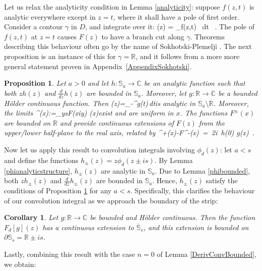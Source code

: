 \documentclass[12pt]{article}
\theoremstyle{plain}
\newtheorem{proposition}[theorem]{Proposition}
\newtheorem{corollary}[theorem]{Corollary}
\theoremstyle{definition}
\numberwithin{equation}{section}
\numberwithin{theorem}{section}
\def\be#1\ee{\begin{equation}#1\end{equation}}
\begin{document}
Let us relax the analyticity condition in Lemma \ref{analyticity}: suppose $f(z,t)$ is analytic everywhere except in $z=t$, where it shall have a pole of first order. Consider a contour $\gamma$ in $D$, and integrate over it: \be
F(z) = \int_\gamma f(z,t) \, dt \ .\ee 
The pole of $f(z,t)$ at $z=t$ causes $F(z)$ to have a branch cut along $\gamma$. Theorems describing this behaviour often go by the name of Sokhotski-Plemelji \cite{Gakhov}. 
The next proposition is an instance of this for $\gamma=\mathbb{R}$, and it follows from a more more general statement proven in Appendix~\ref{AppendixSokhotski}. 

\begin{proposition}\label{SokhotskiConvolutionMain}
Let $a>0$ and let $h:\mathbb{S}_a \rightarrow \mathbb{C}$ be an analytic function such that both $zh(z)$ and $\frac{d}{dz}h(z)$ are bounded in $\mathbb{S}_a$. 
Moreover, let $g:\mathbb{R}\rightarrow \mathbb{C}$ be a bounded 
H\"older continuous 
function. Then  
\be
F(z)=\int_{-\infty}^{\infty}g(t)\,dt\ee is analytic in $\mathbb{S}_a \setminus \mathbb{R}$. Moreover, the limits 
\be
F^\pm(x):=\lim_{y\searrow  s}F(x\pm iy) \hspace{1.5cm}(x\in{})\ee exist and are uniform in $x$.
 The functions $F^\pm(x)$ are bounded on $\mathbb{R}$ and provide  continuous extensions of $F(z)$ from the upper/lower half-plane to the real axis, 
related by 
\be
F^+(x)-F^-(x)~=~2i\pi \, h(0) g(x)\ .\ee
\end{proposition}


Now let us apply this result to convolution integrals involving $\phi_d(z)$: let $a<s$ and define the functions $h_\pm(z)=z\phi_d(z\pm is)$. By Lemma \ref{phianalyticstructure}, $h_\pm(z)$ are analytic in $\mathbb{S}_a$. Due to Lemma \ref{phibounded}, both $zh_\pm(z)$ and $\frac{d}{dz}h_\pm(z)$ are bounded in $\mathbb{S}_a$. Hence, $h_\pm(z)$ satisfy the conditions of Proposition \ref{SokhotskiConvolutionMain} for any $a<s$. Specifically, this clarifies the behaviour of our convolution integral as we approach the boundary of the strip:

\begin{corollary}\label{PhiConvgExtension}
Let $g:\mathbb{R}\rightarrow\mathbb{C}$ be bounded and H\"older continuous. Then the function $F_d[g](z)$ has a continuous extension to $\overline{\mathbb{S}}_s$, and this extension is bounded on $\partial\mathbb{S}_s=\mathbb{R}\pm is$.
\end{corollary}

Lastly, combining this result with the case $n=0$ of Lemma \ref{DerivConvBounded}, we obtain:
\end{document}
